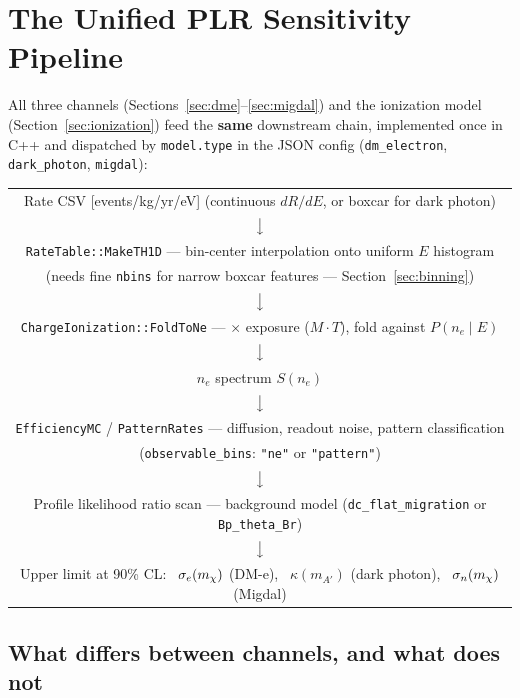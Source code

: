 \section{The Unified PLR Sensitivity Pipeline}
\label{sec:pipeline}

All three channels (Sections~\ref{sec:dme}--\ref{sec:migdal}) and the
ionization model (Section~\ref{sec:ionization}) feed the \textbf{same}
downstream chain, implemented once in C++ and dispatched by
\texttt{model.type} in the JSON config (\texttt{dm\_electron},
\texttt{dark\_photon}, \texttt{migdal}):

\begin{center}
\begin{tabular}{@{}c@{}}
Rate CSV [events/kg/yr/eV] \quad (continuous $dR/dE$, or boxcar for dark photon) \\
$\big\downarrow$ \\
\texttt{RateTable::MakeTH1D} — bin-center interpolation onto uniform $E$
  histogram \\
(needs fine \texttt{nbins} for narrow boxcar features — Section~\ref{sec:binning}) \\
$\big\downarrow$ \\
\texttt{ChargeIonization::FoldToNe} — $\times$ exposure ($M\cdot T$), fold
  against $P(n_e\mid E)$ \\
$\big\downarrow$ \\
$n_e$ spectrum $S(n_e)$ \\
$\big\downarrow$ \\
\texttt{EfficiencyMC} / \texttt{PatternRates} — diffusion, readout noise,
  pattern classification \\
(\texttt{observable\_bins}: \texttt{"ne"} or \texttt{"pattern"}) \\
$\big\downarrow$ \\
Profile likelihood ratio scan — background model (\texttt{dc\_flat\_migration}
  or \texttt{Bp\_theta\_Br}) \\
$\big\downarrow$ \\
Upper limit at 90\% CL: \ $\sigma_e(m_\chi)$ (DM-e), \ $\kappa(m_{A'})$ (dark
  photon), \ $\sigma_n(m_\chi)$ (Migdal)
\end{tabular}
\end{center}

\subsection{What differs between channels, and what does not}

